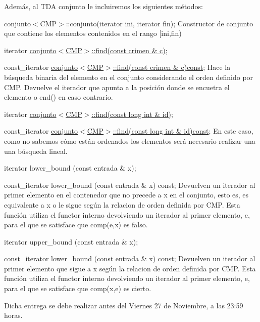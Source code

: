 Además, al T\+D\+A conjunto le incluiremos los siguientes métodos\+: \begin{DoxyItemize}
\item conjunto$<$\+C\+M\+P$>$\+::conjunto(iterator ini, iterator fin); Constructor de conjunto que contiene los elementos contenidos en el rango \mbox{[}ini,fin) \item iterator \hyperlink{classconjunto_a72ee85a4309acdd8274392fc4a765de4}{conjunto$<$\+C\+M\+P$>$\+::find(const crimen \& c)}; \item const\+\_\+iterator \hyperlink{classconjunto_adc065d4751136dbf69b7b74bc7ca0684}{conjunto$<$\+C\+M\+P$>$\+::find(const crimen \& c)const}; Hace la búsqueda binaria del elemento en el conjunto considerando el orden definido por C\+M\+P. Devuelve el iterador que apunta a la posición donde se encuetra el elemento o end() en caso contrario. \item iterator \hyperlink{classconjunto_a01ef97588beb5b28f18d2d8c02881f4c}{conjunto$<$\+C\+M\+P$>$\+::find(const long int \& id)}; \item const\+\_\+iterator \hyperlink{classconjunto_a725ddba7aa25ad0576f13000e035ee6f}{conjunto$<$\+C\+M\+P$>$\+::find(const long int \& id)const}; En este caso, como no sabemos cómo están ordenados los elementos será necesario realizar una una búsqueda lineal. \item iterator lower\+\_\+bound (const entrada \& x); \item const\+\_\+iterator lower\+\_\+bound (const entrada \& x) const; Devuelven un iterador al primer elemento en el contenedor que no precede a x en el conjunto, esto es, es equivalente a x o le sigue según la relacion de orden definida por C\+M\+P. Esta función utiliza el functor interno devolviendo un iterador al primer elemento, e, para el que se satisface que comp(e,x) es falso. \item iterator upper\+\_\+bound (const entrada \& x); \item const\+\_\+iterator lower\+\_\+bound (const entrada \& x) const; Devuelven un iterador al primer elemento que sigue a x según la relacion de orden definida por C\+M\+P. Esta función utiliza el functor interno devolviendo un iterador al primer elemento, e, para el que se satisface que comp(x,e) es cierto.\end{DoxyItemize}
Dicha entrega se debe realizar antes del Viernes 27 de Noviembre, a las 23\+:59 horas. 